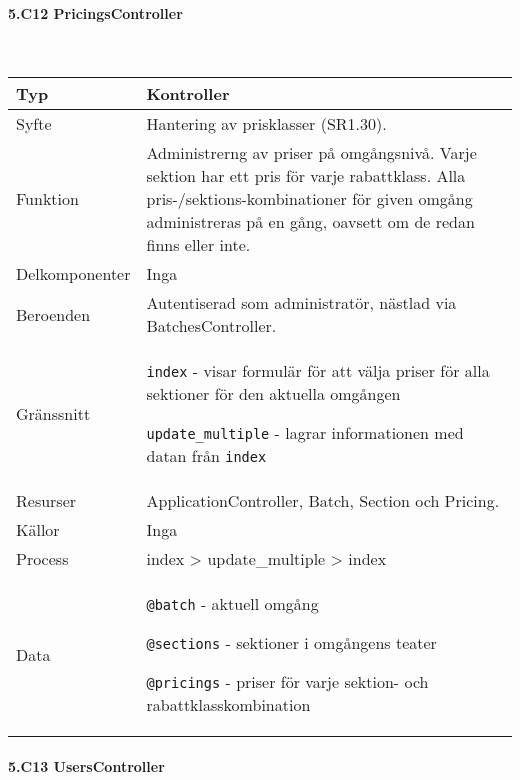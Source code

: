 \documentclass[a4paper, twoside, 11pt, titlepage]{article}
\begin{document}
			\paragraph{5.C12 PricingsController}\

			\begin {table} [ht] \begin{tabular} {  p{3.5cm} p{9.6cm} }
				\hline
				{Typ} & {Kontroller} \\
				\hline
				{Syfte} & {Hantering av prisklasser (SR1.30).} \\
				\hline
				{Funktion} & {Administrerng av priser på omgångsnivå. Varje sektion har ett pris för varje rabattklass. Alla pris-/sektions-kombinationer för given omgång administreras på en gång, oavsett om de redan finns eller inte.} \\
				\hline
				{Delkomponenter} & {Inga} \\
				\hline
				{Beroenden} & {Autentiserad som administratör, nästlad via BatchesController.} \\
				\hline
				{Gränssnitt} & {{\tt index} - visar formulär för att välja priser för alla sektioner för den aktuella omgången

{\tt update\_multiple} - lagrar informationen med datan från {\tt index}} \\
				\hline
				{Resurser} & {ApplicationController, Batch, Section och Pricing.} \\
				\hline
				{Källor} & {Inga} \\
				\hline
				{Process} & {index > update\_multiple > index} \\
				\hline
				{Data} & {{\tt @batch} - aktuell omgång

{\tt @sections} - sektioner i omgångens teater

{\tt @pricings} - priser för varje sektion- och rabattklasskombination} \\
				\hline
			\end{tabular} \end{table} \FloatBarrier


			\paragraph{5.C13 UsersController}\
\end{document}
